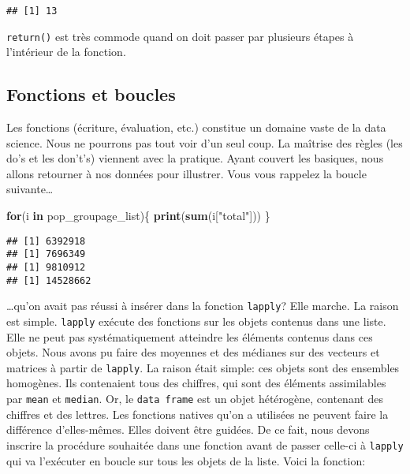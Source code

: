 \documentclass[]{book}
\newenvironment{Shaded}{\begin{snugshade}}{\end{snugshade}}
\newcommand{\KeywordTok}[1]{\textcolor[rgb]{0.13,0.29,0.53}{\textbf{#1}}}
\newcommand{\StringTok}[1]{\textcolor[rgb]{0.31,0.60,0.02}{#1}}
\newcommand{\ControlFlowTok}[1]{\textcolor[rgb]{0.13,0.29,0.53}{\textbf{#1}}}
\newcommand{\NormalTok}[1]{#1}
\begin{document}
\begin{verbatim}
## [1] 13
\end{verbatim}

\texttt{return()} est très commode quand on doit passer par plusieurs
étapes à l'intérieur de la fonction.

\subsection{Fonctions et boucles}\label{fonctions-et-boucles}

Les fonctions (écriture, évaluation, etc.) constitue un domaine vaste de
la data science. Nous ne pourrons pas tout voir d'un seul coup. La
maîtrise des règles (les do's et les don't's) viennent avec la pratique.
Ayant couvert les basiques, nous allons retourner à nos données pour
illustrer. Vous vous rappelez la boucle suivante\ldots{}

\begin{Shaded}
\begin{Highlighting}[]
\ControlFlowTok{for}\NormalTok{(i }\ControlFlowTok{in}\NormalTok{ pop_groupage_list)\{}
  \KeywordTok{print}\NormalTok{(}\KeywordTok{sum}\NormalTok{(i[}\StringTok{"total"}\NormalTok{]))}
\NormalTok{  \}}
\end{Highlighting}
\end{Shaded}

\begin{verbatim}
## [1] 6392918
## [1] 7696349
## [1] 9810912
## [1] 14528662
\end{verbatim}

\ldots{}qu'on avait pas réussi à insérer dans la fonction
\texttt{lapply}? Elle marche. La raison est simple. \texttt{lapply}
exécute des fonctions sur les objets contenus dans une liste. Elle ne
peut pas systématiquement atteindre les éléments contenus dans ces
objets. Nous avons pu faire des moyennes et des médianes sur des
vecteurs et matrices à partir de \texttt{lapply}. La raison était
simple: ces objets sont des ensembles homogènes. Ils contenaient tous
des chiffres, qui sont des éléments assimilables par \texttt{mean} et
\texttt{median}. Or, le \texttt{data\ frame} est un objet hétérogène,
contenant des chiffres et des lettres. Les fonctions natives qu'on a
utilisées ne peuvent faire la différence d'elles-mêmes. Elles doivent
être guidées. De ce fait, nous devons inscrire la procédure souhaitée
dans une fonction avant de passer celle-ci à \texttt{lapply} qui va
l'exécuter en boucle sur tous les objets de la liste. Voici la fonction:
\end{document}
